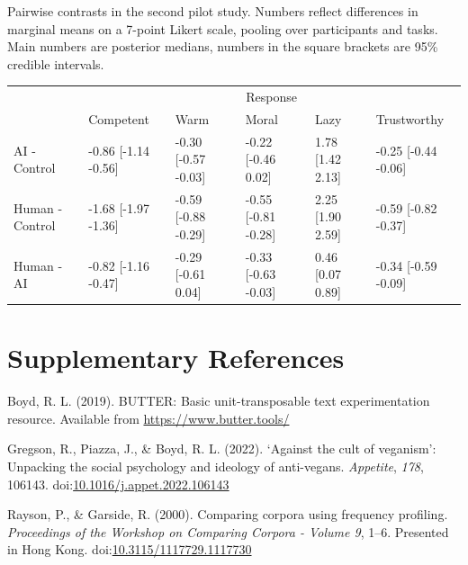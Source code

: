 \documentclass[
  man,
  floatsintext,
  longtable,
  nolmodern,
  notxfonts,
  notimes,
  colorlinks=true,linkcolor=blue,citecolor=blue,urlcolor=blue]{apa7}
\begin{document}
\begin{supptbl}[H]

\caption{\label{supptbl-treatment-diffs-pilotstudy2}Pairwise contrasts
in the second pilot study. Numbers reflect differences in marginal means
on a 7-point Likert scale, pooling over participants and tasks. Main
numbers are posterior medians, numbers in the square brackets are 95\%
credible intervals.}

\begin{minipage}{\linewidth}

\centering\begingroup\fontsize{9}{11}\selectfont

\begin{tabular}{llllll}
\toprule
\multicolumn{1}{c}{ } & \multicolumn{5}{c}{Response} \\
\cmidrule(l{3pt}r{3pt}){2-6}
  & Competent & Warm & Moral & Lazy & Trustworthy\\
\midrule
AI - Control & -0.86 [-1.14 -0.56] & -0.30 [-0.57 -0.03] & -0.22 [-0.46 0.02] & 1.78 [1.42 2.13] & -0.25 [-0.44 -0.06]\\
Human - Control & -1.68 [-1.97 -1.36] & -0.59 [-0.88 -0.29] & -0.55 [-0.81 -0.28] & 2.25 [1.90 2.59] & -0.59 [-0.82 -0.37]\\
Human - AI & -0.82 [-1.16 -0.47] & -0.29 [-0.61 0.04] & -0.33 [-0.63 -0.03] & 0.46 [0.07 0.89] & -0.34 [-0.59 -0.09]\\
\bottomrule
\end{tabular}
\endgroup{}

\end{minipage}%

\end{supptbl}%

\newpage

\section{Supplementary References}\label{supplementary-references}

\setlength{\parindent}{-20pt}
\setlength{\leftskip}{20pt}

Boyd, R. L. (2019). BUTTER: Basic unit-transposable text experimentation
resource. Available from \url{https://www.butter.tools/}

Gregson, R., Piazza, J., \& Boyd, R. L. (2022). `Against the cult of
veganism': Unpacking the social psychology and ideology of anti-vegans.
\emph{Appetite}, \emph{178}, 106143.
doi:\href{https://doi.org/10.1016/j.appet.2022.106143}{10.1016/j.appet.2022.106143}

Rayson, P., \& Garside, R. (2000). Comparing corpora using frequency
profiling. \emph{Proceedings of the Workshop on Comparing Corpora -
Volume 9}, 1--6. Presented in Hong Kong.
doi:\href{https://doi.org/10.3115/1117729.1117730}{10.3115/1117729.1117730}
\end{document}
